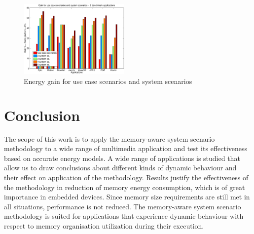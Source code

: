 \documentclass[a4paper,conference]{IEEEtran}
\begin{document}
\begin{figure}[!t]
\centering
\includegraphics[width=0.48\textwidth]{Images/usecase.eps}
\caption{Energy gain for use case scenarios and system scenarios}
\label{fig:usecase}
\end{figure}

\section{Conclusion}
\label{sec:conclusion}

The scope of this work is to apply the memory-aware system scenario methodology to a wide range of multimedia application and test its effectiveness based on accurate energy models. A wide range of applications is studied that allow us to draw conclusions about different kinds of dynamic behaviour and their effect on application of the methodology. Results justify the effectiveness of the methodology in reduction of memory energy consumption, which is of great importance in embedded devices. Since memory size requirements are still met in all situations, performance is not reduced. The memory-aware system scenario methodology is suited for applications that experience dynamic behaviour with respect to memory organisation utilization during their execution.



%

\end{document}
